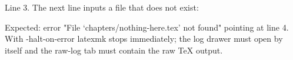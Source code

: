\documentclass{article}
\begin{document}
Line 3. The next line inputs a file that does not exist:


Expected: error "File `chapters/nothing-here.tex' not found" pointing at line 4.
With -halt-on-error latexmk stops immediately; the log drawer must open by
itself and the raw-log tab must contain the raw TeX output.
\end{document}
